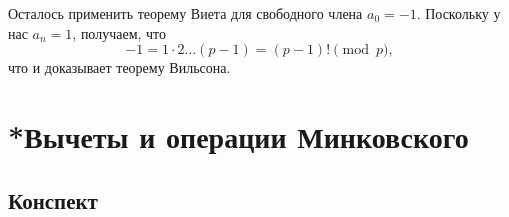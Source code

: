 \begin{enumerate}
Осталось применить теорему Виета для свободного члена $a_0=-1$. Поскольку у нас $a_n=1$, получаем, что
$$
-1=1\cdot 2\dots(p-1)=(p-1)!\pmod p,
$$
что и доказывает теорему Вильсона.
\epf



\end{enumerate}


\section{*Вычеты и операции Минковского}\label{Faktor}


\subsection*{Конспект}
